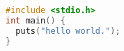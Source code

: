 \begin{lstlisting}[language=C,
  basicstyle=\ttfamily,
  stringstyle=\color{blue}]
#include <stdio.h>
int main() {
  puts("hello world.");
}
\end{lstlisting}
